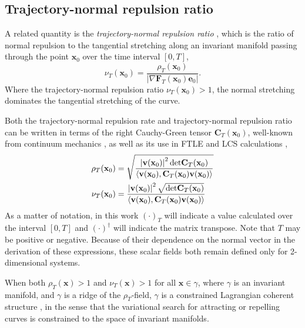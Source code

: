 \documentclass[twocolumn]{svjour3}
\begin{document}
\subsection{Trajectory-normal repulsion ratio}
A related quantity is the {\it trajectory-normal repulsion ratio} \cite{haller_variational_2011}, which is the ratio of normal repulsion to the tangential stretching along an invariant manifold passing through the point $\textbf{x}_0$ over the time interval $[0, T]$,
\begin{equation}
\nu_T(\mathbf{x}_0) = \frac{\rho_T(\mathbf{x}_0)}{\left|\nabla\mathbf{F}_T (\mathbf{x}_0) \mathbf{e}_0\right|}.
\end{equation}
Where the trajectory-normal repulsion ratio \(\nu_T(\mathbf{x}_0)>1\), the normal stretching dominates the tangential stretching of the curve. 

Both the trajectory-normal repulsion rate and trajectory-normal repulsion ratio can be written in terms of the right Cauchy-Green tensor $\mathbf{C}_T (\mathbf{x}_0)$, well-known from continuum mechanics \cite{truesdell2004non}, as well as its use in FTLE and LCS calculations \cite{haller_variational_2011},
\begin{equation}
\begin{aligned}
\rho_T(\mathbf{x}_0) 
& = \sqrt{ \frac{
\left| \mathbf{v}(\mathbf{x}_0)\right|^2 {\rm det} \mathbf{C}_T (\mathbf{x}_0)}{
\langle \mathbf{v}(\mathbf{x}_0),\mathbf{C}_T (\mathbf{x}_0) \mathbf{v}(\mathbf{x}_0) \rangle
} } \\
\nu_T(\mathbf{x}_0) 
& =  \frac{
\left| \mathbf{v}(\mathbf{x}_0)\right|^2 \sqrt{{\rm det} \mathbf{C}_T (\mathbf{x}_0)}}{
\langle \mathbf{v}(\mathbf{x}_0),\mathbf{C}_T (\mathbf{x}_0) \mathbf{v}(\mathbf{x}_0) \rangle
}
\end{aligned}
\label{eq:rhoT}
\end{equation}
As a matter of notation, in this work \((\cdot)_T\) will indicate a value calculated over the interval $[0, T]$ and \((\cdot)^\dagger\) will indicate the matrix transpose. Note that $T$ may be positive or negative. Because of their dependence on the normal vector in the derivation of these expressions, these scalar fields both remain defined only for 2-dimensional systems.

When both $\rho_T(\mathbf{x})>1$ and $\nu_T(\mathbf{x})>1$ for all $\mathbf{x}\in\gamma$, where $\gamma$ is an invariant manifold, and $\gamma$ is a ridge of the $\rho_T$-field, $\gamma$ is a constrained Lagrangian coherent structure \cite{haller_variational_2011}, in the sense that the variational search for attracting or repelling curves is constrained to the space of invariant manifolds.
\end{document}

